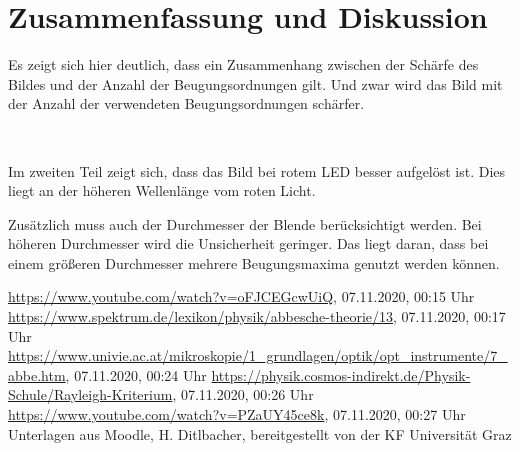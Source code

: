 \documentclass{article}
\begin{document}
\section{Zusammenfassung und Diskussion}

Es zeigt sich hier deutlich, dass ein Zusammenhang zwischen der Schärfe des Bildes und der Anzahl der Beugungsordnungen gilt. Und zwar wird das Bild mit der Anzahl der verwendeten Beugungsordnungen schärfer.

~

Im zweiten Teil zeigt sich, dass das Bild bei rotem LED besser aufgelöst ist. Dies liegt an der höheren Wellenlänge vom roten Licht.

Zusätzlich muss auch der Durchmesser der Blende berücksichtigt werden. Bei höheren Durchmesser wird die Unsicherheit geringer. Das liegt daran, dass bei einem größeren Durchmesser mehrere Beugungsmaxima genutzt werden können.









%

%


%


\begin{thebibliography}{9}
 \url{https://www.youtube.com/watch?v=oFJCEGcwUiQ}, 07.11.2020, 00:15 Uhr
 \url{https://www.spektrum.de/lexikon/physik/abbesche-theorie/13}, 07.11.2020, 00:17 Uhr
 \url{https://www.univie.ac.at/mikroskopie/1_grundlagen/optik/opt_instrumente/7_abbe.htm}, 07.11.2020, 00:24 Uhr
 \url{https://physik.cosmos-indirekt.de/Physik-Schule/Rayleigh-Kriterium}, 07.11.2020, 00:26 Uhr
 \url{https://www.youtube.com/watch?v=PZaUY45ce8k}, 07.11.2020, 00:27 Uhr
 Unterlagen aus Moodle, H. Ditlbacher, bereitgestellt von der KF Universität Graz
\end{thebibliography}
\end{document}
